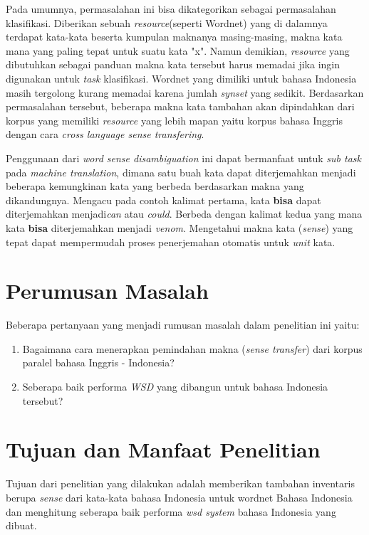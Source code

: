 Pada umumnya, permasalahan ini bisa dikategorikan sebagai permasalahan klasifikasi. Diberikan sebuah \textit{resource}(seperti Wordnet) yang di dalamnya terdapat kata-kata beserta kumpulan maknanya masing-masing, makna kata mana yang paling tepat untuk suatu kata "x". Namun demikian, \textit{resource} yang dibutuhkan sebagai panduan makna kata tersebut harus memadai jika ingin digunakan untuk \textit{task} klasifikasi. Wordnet yang dimiliki untuk bahasa Indonesia masih tergolong kurang memadai karena jumlah \textit{synset} yang sedikit. Berdasarkan permasalahan tersebut, beberapa makna kata tambahan akan dipindahkan dari korpus yang memiliki \textit{resource} yang lebih mapan yaitu korpus bahasa Inggris dengan cara \textit{cross language sense transfering}.

Penggunaan dari \textit{word sense disambiguation} ini dapat bermanfaat untuk \textit{sub task} pada \textit{machine translation}, dimana satu buah kata dapat diterjemahkan menjadi beberapa kemungkinan kata yang berbeda berdasarkan makna yang dikandungnya. Mengacu pada contoh kalimat pertama, kata \textbf{bisa} dapat diterjemahkan menjadi\textit{can} atau \textit{could}. Berbeda dengan kalimat kedua yang mana kata \textbf{bisa} diterjemahkan menjadi \textit{venom}. Mengetahui makna kata (\textit{sense}) yang tepat dapat mempermudah proses penerjemahan otomatis untuk \textit{unit} kata.

\section{Perumusan Masalah}
Beberapa pertanyaan yang menjadi rumusan masalah dalam penelitian ini yaitu:
\begin{enumerate}
	\item Bagaimana cara menerapkan pemindahan makna (\textit{sense transfer}) dari korpus paralel bahasa Inggris - Indonesia?
	\item Seberapa baik performa \textit{WSD} yang dibangun untuk bahasa Indonesia tersebut?
\end{enumerate}

\section{Tujuan dan Manfaat Penelitian}
Tujuan dari penelitian yang dilakukan adalah memberikan tambahan inventaris berupa \textit{sense} dari kata-kata bahasa Indonesia untuk wordnet Bahasa Indonesia dan menghitung seberapa baik performa \textit{wsd system} bahasa Indonesia yang dibuat.

